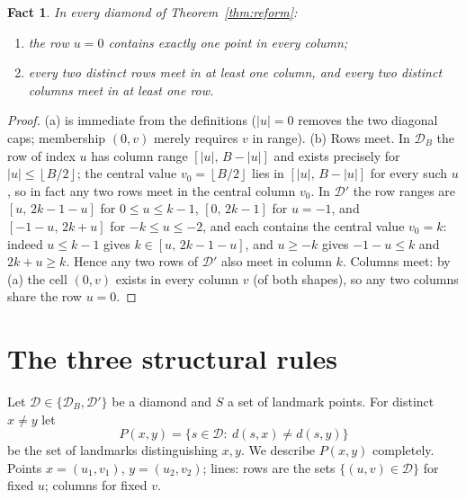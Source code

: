 \documentclass[12pt]{article}
\newtheorem{fact}[theorem]{Fact}
\theoremstyle{definition}
\newcommand{\DD}{\mathcal{D}}
\newcommand{\DDs}{\mathcal{D}'}
\newcommand{\floor}[1]{\left\lfloor #1 \right\rfloor}
\begin{document}
\begin{fact}\label{fact:lines}
In every diamond of Theorem~\ref{thm:reform}:
\begin{enumerate}[label=\textup{(\alph*)},leftmargin=6mm]
\item the row $u=0$ contains exactly one point in \emph{every} column;
\item every two distinct rows meet in at least one column, and every two distinct columns meet in at least one row.
\end{enumerate}
\end{fact}

\begin{proof}
(a) is immediate from the definitions ($|u|=0$ removes the two diagonal caps; membership $(0,v)$ merely requires $v$ in range). (b) Rows meet. In $\DD_B$ the row of index $u$ has column range $[|u|,\,B-|u|]$ and exists precisely for $|u|\le\floor{B/2}$; the central value $v_0=\floor{B/2}$ lies in $[|u|,\,B-|u|]$ for every such $u$, so in fact any two rows meet in the central column $v_0$. In $\DDs$ the row ranges are $[u,\,2k-1-u]$ for $0\le u\le k-1$, $[0,\,2k-1]$ for $u=-1$, and $[-1-u,\,2k+u]$ for $-k\le u\le-2$, and each contains the central value $v_0=k$: indeed $u\le k-1$ gives $k\in[u,\,2k-1-u]$, and $u\ge-k$ gives $-1-u\le k$ and $2k+u\ge k$. Hence any two rows of $\DDs$ also meet in column $k$. Columns meet: by (a) the cell $(0,v)$ exists in every column $v$ (of both shapes), so any two columns share the row $u=0$.
\end{proof}

\section{The three structural rules}\label{sec:rules}

Let $\DD\in\{\DD_B,\DDs\}$ be a diamond and $S$ a set of landmark points. For distinct $x\neq y$ let
\[
P(x,y)=\{s\in\DD:\ d(s,x)\neq d(s,y)\}
\]
be the set of landmarks distinguishing $x,y$. We describe $P(x,y)$ completely. Points $x=(u_1,v_1)$, $y=(u_2,v_2)$; lines: rows are the sets $\{(u,v)\in\DD\}$ for fixed $u$; columns for fixed $v$.
\end{document}
